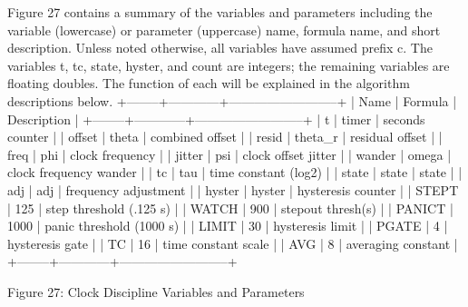    Figure 27 contains a summary of the variables and parameters
   including the variable (lowercase) or parameter (uppercase) name,
   formula name, and short description.  Unless noted otherwise, all
   variables have assumed prefix c.  The variables t, tc, state, hyster,
   and count are integers; the remaining variables are floating doubles.
   The function of each will be explained in the algorithm descriptions
   below.
                   +--------+------------+--------------------------+
                | Name   | Formula    | Description              |
                +--------+------------+--------------------------+
                | t      | timer      | seconds counter          |
                | offset | theta      | combined offset          |
                | resid  | theta_r    | residual offset          |
                | freq   | phi        | clock frequency          |
                | jitter | psi        | clock offset jitter      |
                | wander | omega      | clock frequency wander   |
                | tc     | tau        | time constant (log2)     |
                | state  | state      | state                    |
                | adj    | adj        | frequency adjustment     |
                | hyster | hyster     | hysteresis counter       |
                | STEPT  | 125        | step threshold (.125 s)  |
                | WATCH  | 900        | stepout thresh(s)        |
                | PANICT | 1000       | panic threshold (1000 s) |
                | LIMIT  | 30         | hysteresis limit         |
                | PGATE  | 4          | hysteresis gate          |
                | TC     | 16         | time constant scale      |
                | AVG    | 8          | averaging constant       |
                +--------+------------+--------------------------+

           Figure 27: Clock Discipline Variables and Parameters

